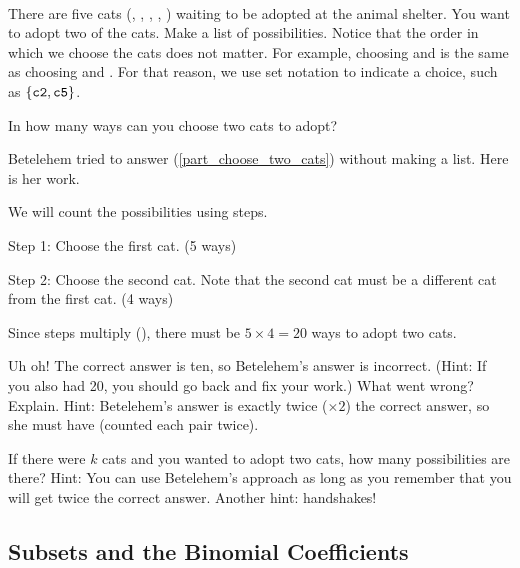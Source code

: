 \begin{act} 
\label{act_adopting_two_cats}  
~
    \begin{actpart}
        \item \label{part_list_two_cats} There are five cats (, , , , ) waiting to be adopted at the animal shelter. You want to adopt two of the cats.  Make a list of possibilities. Notice that the order in which we choose the cats does not matter.  For example, choosing  and  is the same as choosing  and .  For that reason, we use set notation to indicate a choice, such as $\{\texttt{c2}, \texttt{c5}\}$.
        \item \label{part_choose_two_cats} In how many ways can you choose two cats to adopt?
        \item Betelehem tried to answer (\ref{part_choose_two_cats}) without making a list. Here is her work.
            \begin{soln}
                We will count the possibilities using steps.
            
                Step 1: Choose the first cat. (5 ways)

                Step 2: Choose the second cat.  Note that the second cat must be a different cat from the first cat. (4 ways)

                Since steps multiply (), there must be $5 \times 4 = 20$ ways to adopt two cats.        
            \end{soln}

        Uh oh!  The correct answer is ten, so Betelehem's answer is incorrect. (Hint: If you also had 20, you should go back and fix your work.) What went wrong?  Explain.  Hint: Betelehem's answer is exactly twice ($\times 2$) the correct answer, so she must have  (counted each pair twice). 
        \item \label{part_kchoose2_cats} If there were $k$ cats and you wanted to adopt two cats, how many possibilities are there?  Hint: You can use Betelehem's approach as long as you remember that you will get twice the correct answer.  Another hint: handshakes! 
    \end{actpart}
\end{act} 

\newcommand{\subsubsetschoose}{Subsets and the Binomial Coefficients}
\subsection{\subsubsetschoose}
\label{sub_subsets_choose}

